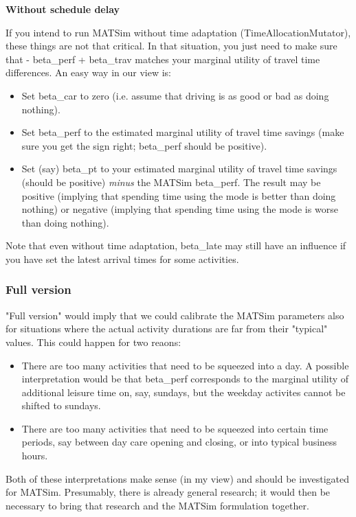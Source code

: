 \textbf{Without schedule delay}

If you intend to run MATSim without time adaptation  (TimeAllocationMutator), these things are not that critical. In  that situation, you just need to make sure that - beta\_perf + beta\_trav  matches your marginal utility of travel time differences. An easy  way in our view is:
\begin{itemize}
	\item Set beta\_car to zero (i.e. assume that driving is as good or bad as doing nothing).
	\item Set beta\_perf to the estimated marginal utility of travel time  savings (make sure you get the sign right; beta\_perf should be  positive).
	\item Set (say) beta\_pt to your estimated marginal utility of travel time savings (should be positive) \emph{minus}  the MATSim beta\_perf. The result may be positive (implying that  spending time using the mode is better than doing nothing) or negative  (implying that spending time using the mode is worse than doing  nothing).
\end{itemize}

Note that even without time adaptation, beta\_late may still have  an influence if you have set the latest arrival times for some  activities.

\subsubsection{Full version}

"Full version" would imply that we could calibrate the MATSim  parameters also for situations where the actual activity durations are  far from their "typical" values. This could happen for two reaons:
\begin{itemize}
	\item There are too many activities that need to be squeezed into a  day. A possible interpretation would be that beta\_perf corresponds  to the marginal utility of additional leisure time on, say, sundays,  but the weekday activites cannot be shifted to sundays.
	\item There are too many activities that need to be squeezed into certain  time periods, say between day care opening and closing, or into typical  business hours.
\end{itemize}

Both of these interpretations make sense (in my view) and should  be investigated for MATSim. Presumably, there is already general  research; it would then be necessary to bring that research and the  MATSim formulation together.

